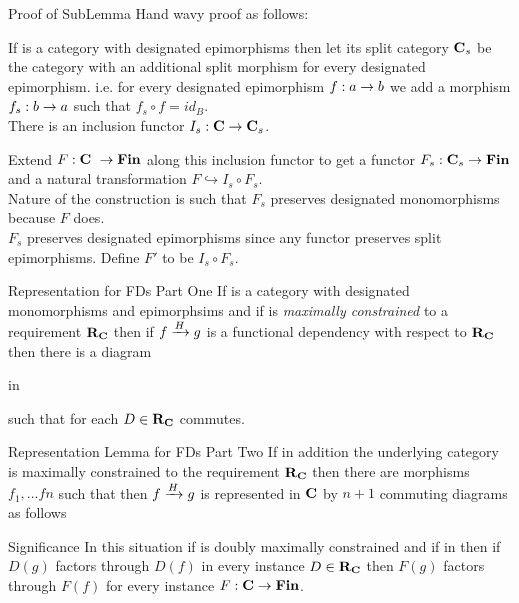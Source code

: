 \begin{frame}{Proof of SubLemma}
Hand wavy proof as follows:

If \catcw is a category with designated epimorphisms then let its split category 
$\catc_s$ be the category \catcw with an additional split morphism for every designated epimorphism.
i.e. for every designated epimorphism $f: a \morph b$ we add a morphism $f_s:b \morph a$
such that $f_s \circ f = id_B$. \\

There is an inclusion functor $I_s:\catc \morph \catc_s$.

Extend $F:\catcw \morph \Fin$ along this inclusion functor  to get a functor 
$F_s:\catc_s \morph \Fin$ and a natural transformation $F \hookrightarrow I_s \circ F_s$. \\
\medskip
Nature of the construction is such that $F_s$ preserves designated monomorphisms because $F$ does.\\
\medskip
$F_s$ preserves designated epimorphisms since any functor preserves split epimorphisms.
Define $F'$ to be $I_s \circ F_s$.
\end{frame}

\begin{frame}{Representation for FDs Part One}
If \catcw is a category with designated monomorphisms and epimorphsims  and if \catcw is
\textit{maximally constrained} to a requirement $\reqtc$ then
if $\fundep{H}{f}{g}$  is a functional dependency with respect to $\reqtc$
then there is a diagram\\
\medskip
\begin{minipage}[t][.45cm][t]{5.5cm} %
\scalebox{0.9}{\representationdiagram} 
\hspace*{\fill} in \catc
\end{minipage} 
\pause \begin{minipage}[t]{4.5cm}
such that for each $D \in \reqtc$
\scalebox{0.85}{\mappedrepresentationdiagram}
\hspace*{\fill} commutes.
\end{minipage}
\end{frame}

\begin{frame}{Representation Lemma for FDs Part Two}
If in addition the underlying category \catcw is maximally constrained  
 to the requirement $\reqtc$ then
there are morphisms $f_1,...fn$ such that
then $\fundep{H}{f}{g}$ is represented in $\catc$ by  $n+1$ commuting diagrams
as follows
\begin{center}
\scalebox{0.9}{\fullrepresentationdiagram}
\end{center} 
\end{frame}
\begin{frame}{Significance}
In this situation if \catcw is doubly maximally constrained 
and if \scalebox{0.9}{\fgsourcediagram} in \catcw
then if $D(g)$ factors through
$D(f)$ in every instance $D \in \reqtc$  then   
$F(g)$ factors through
$F(f)$ for every instance $F: \catc \morph \Fin$. 
\end{frame}

